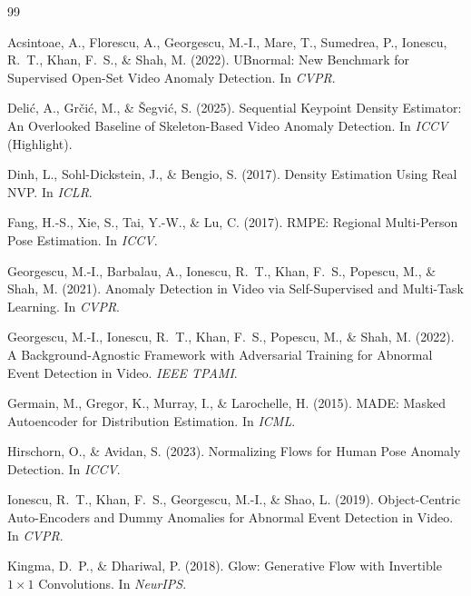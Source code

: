 \documentclass{article}
\begin{document}

\begin{thebibliography}{99}

Acsintoae, A., Florescu, A., Georgescu, M.-I., Mare, T., Sumedrea, P.,
Ionescu, R.~T., Khan, F.~S., \& Shah, M. (2022).
\newblock UBnormal: New Benchmark for Supervised Open-Set Video Anomaly Detection.
In {\em CVPR}.

Deli{\'c}, A., Gr{\v c}i{\'c}, M., \& {\v S}egvi{\'c}, S. (2025).
\newblock Sequential Keypoint Density Estimator: An Overlooked Baseline of
Skeleton-Based Video Anomaly Detection.
\newblock In {\em ICCV} (Highlight).

Dinh, L., Sohl-Dickstein, J., \& Bengio, S. (2017). Density Estimation Using Real NVP. In {\em ICLR}.

Fang, H.-S., Xie, S., Tai, Y.-W., \& Lu, C. (2017).
\newblock RMPE: Regional Multi-Person Pose Estimation.
In {\em ICCV}.

Georgescu, M.-I., Barbalau, A., Ionescu, R.~T., Khan, F.~S., Popescu, M., \&
Shah, M. (2021).
\newblock Anomaly Detection in Video via Self-Supervised and Multi-Task Learning.
In {\em CVPR}.

Georgescu, M.-I., Ionescu, R.~T., Khan, F.~S., Popescu, M., \& Shah, M. (2022).
\newblock A Background-Agnostic Framework with Adversarial Training for Abnormal Event Detection in Video.
{\em IEEE TPAMI}.

Germain, M., Gregor, K., Murray, I., \& Larochelle, H. (2015).
\newblock MADE: Masked Autoencoder for Distribution Estimation.
In {\em ICML}.

Hirschorn, O., \& Avidan, S. (2023).
\newblock Normalizing Flows for Human Pose Anomaly Detection.
In {\em ICCV}.

Ionescu, R.~T., Khan, F.~S., Georgescu, M.-I., \& Shao, L. (2019).
\newblock Object-Centric Auto-Encoders and Dummy Anomalies for Abnormal
Event Detection in Video.
In {\em CVPR}.

Kingma, D.~P., \& Dhariwal, P. (2018).
\newblock Glow: Generative Flow with Invertible $1{\times}1$ Convolutions.
In {\em NeurIPS}.


\end{thebibliography}
\end{document}
